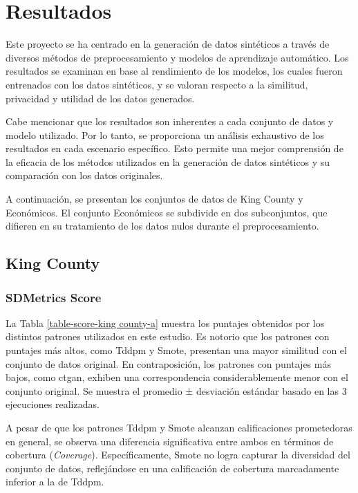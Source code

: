 \chapter{Resultados}
Este proyecto se ha centrado en la generación de datos sintéticos a través de diversos métodos de preprocesamiento y modelos de aprendizaje automático. Los resultados se examinan en base al rendimiento de los modelos, los cuales fueron entrenados con los datos sintéticos, y se valoran respecto a la similitud, privacidad y utilidad de los datos generados.

Cabe mencionar que los resultados son inherentes a cada conjunto de datos y modelo utilizado. Por lo tanto, se proporciona un análisis exhaustivo de los resultados en cada escenario específico. Esto permite una mejor comprensión de la eficacia de los métodos utilizados en la generación de datos sintéticos y su comparación con los datos originales.

A continuación, se presentan los conjuntos de datos de King County y Económicos. El conjunto Económicos se subdivide en dos subconjuntos, que difieren en su tratamiento de los datos nulos durante el preprocesamiento.

\newpage
\section{King County}
\subsection{SDMetrics Score}
La Tabla \ref{table-score-king county-a} muestra los puntajes obtenidos por los distintos patrones utilizados en este estudio. Es notorio que los patrones con puntajes más altos, como Tddpm y Smote, presentan una mayor similitud con el conjunto de datos original. En contraposición, los patrones con puntajes más bajos, como ctgan, exhiben una correspondencia considerablemente menor con el conjunto original. Se muestra el promedio ± desviación estándar basado en las 3 ejecuciones realizadas.

    
A pesar de que los patrones Tddpm y Smote alcanzan calificaciones prometedoras en general, se observa una diferencia significativa entre ambos en términos de cobertura (\emph{Coverage}). Específicamente, Smote no logra capturar la diversidad del conjunto de datos, reflejándose en una calificación de cobertura marcadamente inferior a la de Tddpm.

